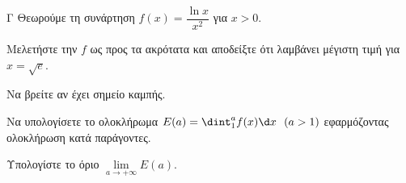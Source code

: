 \begin{thema}{Γ}
Θεωρούμε τη συνάρτηση $f(x) = \dfrac{\ln x}{x^2}$ για $x > 0$.
\begin{erwthma}
  \item Μελετήστε την $f$ ως προς τα ακρότατα και αποδείξτε ότι λαμβάνει μέγιστη τιμή για $x = \sqrt{e}$.
  \item Να βρείτε αν έχει σημείο καμπής.
  \item Να υπολογίσετε το ολοκλήρωμα $E(a)=\dint_1^a f(x) \d x \ \ (a > 1)$ εφαρμόζοντας ολοκλήρωση κατά παράγοντες. 
  \item Υπολογίστε το όριο $\lim\limits_{a \to +\infty}E(a)$.
\end{erwthma}
\end{thema}
